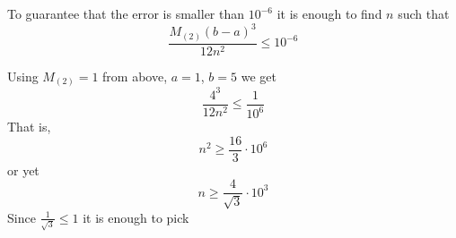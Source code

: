 \documentclass[main]{subfiles}
\begin{document}
\begin{enumerate}
\begin{enumerate}
\begin{solution}
To guarantee that the error is smaller than $10^{-6}$ it is enough to find $n$ such that 
\[\frac{M_{(2)}(b-a)^3}{12n^2} \leq 10^{-6}\]

Using $M_{(2)} = 1$ from above, $a = 1$, $b=5$ we get
\[\frac{4^3}{12n^2} \leq \frac{1}{10^{6}}\]
That is,
\[n^2 \geq \frac{16}{3} \cdot 10^6\]
or yet
\[n \geq \frac{4}{\sqrt{3}} \cdot 10^3\]
Since $\frac{1}{\sqrt{3}} \leq 1$ it is enough to pick 

\end{solution}

\end{enumerate}



 \end{enumerate}

 
\end{document}
